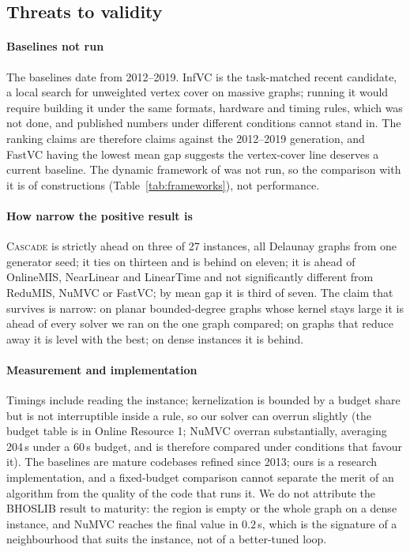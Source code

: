 \documentclass[pdflatex,sn-mathphys-num]{sn-jnl}
\theoremstyle{thmstyleone}%
\theoremstyle{thmstyletwo}%
\begin{document}
\subsection{Threats to validity}
\label{sec:threats}

\paragraph{Baselines not run} The baselines date from 2012--2019. InfVC
\citep{sun2025infvc} is the task-matched recent candidate, a local search for unweighted
vertex cover on massive graphs; running it would require building it under the same
formats, hardware and timing rules, which was not done, and published numbers under
different conditions cannot stand in. The ranking claims are therefore claims against the
2012--2019 generation, and FastVC having the lowest mean gap suggests the vertex-cover line
deserves a current baseline. The dynamic framework of \citet{borowitz2025} was not run, so
the comparison with it is of constructions (Table~\ref{tab:frameworks}), not performance.

\paragraph{How narrow the positive result is} \textsc{Cascade} is strictly ahead on three
of 27 instances, all Delaunay graphs from one generator seed; it ties on thirteen and is
behind on eleven; it is ahead of OnlineMIS, NearLinear and LinearTime and not
significantly different from ReduMIS, NuMVC or FastVC; by mean gap it is third of seven.
The claim that survives is narrow: on planar bounded-degree graphs whose kernel stays
large it is ahead of every solver we ran on the one graph compared; on graphs that reduce
away it is level with the best; on dense instances it is behind.

\paragraph{Measurement and implementation} Timings include reading the instance;
kernelization is bounded by a budget share but is not interruptible inside a rule, so our
solver can overrun slightly (the budget table is in Online Resource 1; NuMVC overran
substantially, averaging 204\,s under a 60\,s budget, and is therefore compared under
conditions that favour it). The baselines are mature codebases refined since 2013; ours is
a research implementation, and a fixed-budget comparison cannot separate the merit of an
algorithm from the quality of the code that runs it. We do not attribute the BHOSLIB result
to maturity: the region is empty or the whole graph on a dense instance, and NuMVC
reaches the final value in $0.2$\,s, which is the signature of a neighbourhood that suits
the instance, not of a better-tuned loop.
\end{document}
